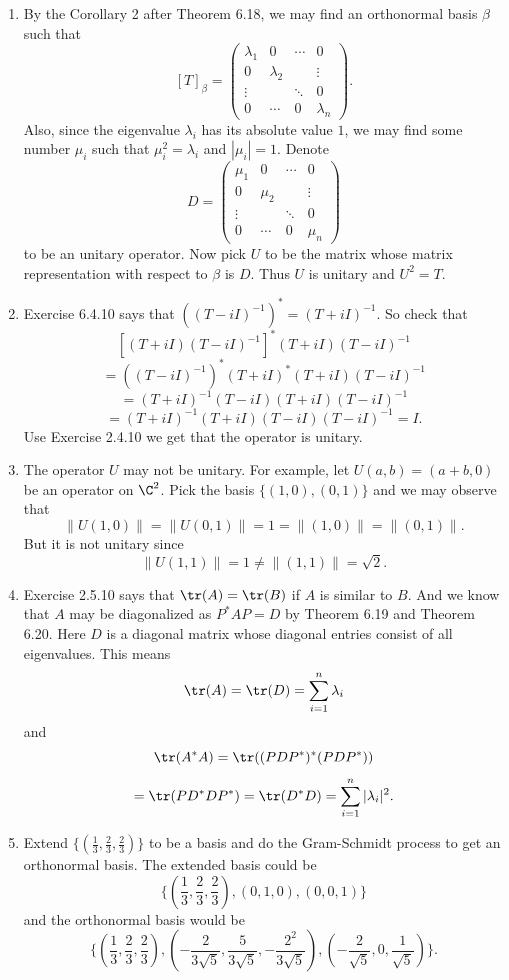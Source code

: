 \begin{enumerate}
\item By the Corollary 2 after Theorem 6.18, we may find an orthonormal basis $\beta $ such that 
\[[T]_{\beta}=\begin{pmatrix}\lambda_1&0&\cdots &0\\0&\lambda_2& &\vdots\\ \vdots &&\ddots &0\\0&\cdots &0&\lambda_n\end{pmatrix}.\]
Also, since the eigenvalue $\lambda_i$ has its absolute value $1$, we may find some number $\mu_i$ such that $\mu_i^2=\lambda_i$ and $|\mu_i|=1$. Denote 
\[D=\begin{pmatrix}\mu_1&0&\cdots &0\\0&\mu_2& &\vdots\\ \vdots &&\ddots &0\\0&\cdots &0&\mu_n\end{pmatrix}\]
to be an unitary operator. Now pick $U$ to be the matrix whose matrix representation with respect to $\beta $ is $D$. Thus $U$ is unitary and $U^2=T$.
\item Exercise 6.4.10 says that $((T-iI)^{-1})^* = (T+iI)^{-1}$. So check that 
\[[(T+iI)(T-iI)^{-1}]^*(T+iI)(T-iI)^{-1}\]
\[=((T-iI)^{-1})^*(T+iI)^*(T+iI)(T-iI)^{-1}\]
\[=(T+iI)^{-1}(T-iI)(T+iI)(T-iI)^{-1}\]
\[=(T+iI)^{-1}(T+iI)(T-iI)(T-iI)^{-1}=I.\]
Use Exercise 2.4.10 we get that the operator is unitary.
\item The operator $U$ may not be unitary. For example, let $U(a,b)=(a+b,0)$ be an operator on $\C^2$. Pick the basis $\{(1,0),(0,1)\}$ and we may observe that 
\[\|U(1,0)\|=\|U(0,1)\|=1=\|(1,0)\|=\|(0,1)\|.\]
But it is not unitary since 
\[\|U(1,1)\|=1\neq \|(1,1)\|=\sqrt{2}.\]
\item Exercise 2.5.10 says that $\tr(A)=\tr(B)$ if $A$ is similar to $B$. And we know that $A$ may be diagonalized as $P^*AP=D$ by Theorem 6.19 and Theorem 6.20. Here $D$ is a diagonal matrix whose diagonal entries consist of all eigenvalues. This means 
\[\tr(A)=\tr(D)=\sum_{i=1}^n{\lambda_i}\]
and 
\[\tr(A^*A)=\tr((PDP^*)^*(PDP^*))\]
\[=\tr(PD^*DP^*)=\tr(D^*D)=\sum_{i=1}^n{|\lambda_i|^2}.\]
\item Extend $\{(\frac{1}{3},\frac{2}{3},\frac{2}{3})\}$ to be a basis and do the Gram-Schmidt process to get an orthonormal basis. The extended basis could be 
\[\{(\frac{1}{3},\frac{2}{3},\frac{2}{3}),(0,1,0),(0,0,1)\}\]
and the orthonormal basis would be 
\[\{(\frac{1}{3},\frac{2}{3},\frac{2}{3}),(-\frac{2}{3\sqrt{5}},\frac{5}{3\sqrt{5}},-\frac{{2}^{2}}{3\sqrt{5}}),(-\frac{2}{\sqrt{5}},0,\frac{1}{\sqrt{5}})\}.\]

\end{enumerate}
